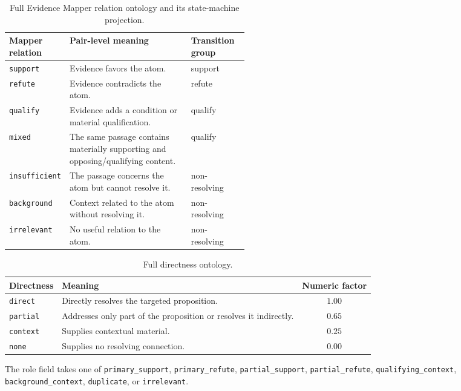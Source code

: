 \begin{table}[t]
\centering
\small
\begin{tabularx}{\linewidth}{@{}p{0.22\linewidth}X
p{0.24\linewidth}@{}}
\hline
Mapper relation & Pair-level meaning & Transition group \\
\hline
\texttt{support} & Evidence favors the atom. & support \\
\texttt{refute} & Evidence contradicts the atom. & refute \\
\texttt{qualify} & Evidence adds a condition or material qualification. &
qualify \\
\texttt{mixed} & The same passage contains materially supporting and
opposing/qualifying content. & qualify \\
\texttt{insufficient} & The passage concerns the atom but cannot resolve it. &
non-resolving \\
\texttt{background} & Context related to the atom without resolving it. &
non-resolving \\
\texttt{irrelevant} & No useful relation to the atom. & non-resolving \\
\hline
\end{tabularx}
\caption{Full Evidence Mapper relation ontology and its state-machine
projection.}
\label{tab:supp-map-relations}
\end{table}

\begin{table}[t]
\centering
\small
\begin{tabularx}{\linewidth}{lXc}
\hline
Directness & Meaning & Numeric factor \\
\hline
\texttt{direct} & Directly resolves the targeted proposition. & \(1.00\) \\
\texttt{partial} & Addresses only part of the proposition or resolves it
indirectly. & \(0.65\) \\
\texttt{context} & Supplies contextual material. & \(0.25\) \\
\texttt{none} & Supplies no resolving connection. & \(0.00\) \\
\hline
\end{tabularx}
\caption{Full directness ontology.}
\label{tab:supp-map-directness}
\end{table}

The role field takes one of
\texttt{primary\_support}, \texttt{primary\_refute},
\texttt{partial\_support}, \texttt{partial\_refute},
\texttt{qualifying\_context}, \texttt{background\_context},
\texttt{duplicate}, or \texttt{irrelevant}.

